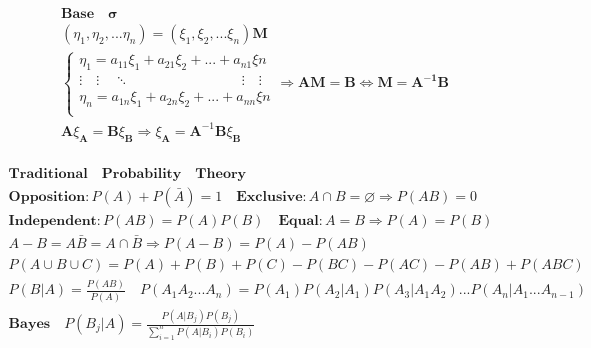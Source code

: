 \documentclass{article}
\begin{document}
\clearpage
\begin{align*} 
    \bm{Base \quad \sigma} \\ 
    (\eta_{1},\eta_{2},...\eta_{n}) = (\xi_{1},\xi_{2},...\xi_{n})\mathbf{M} \\ 
    \left\{
        \begin{array}{rl}
            \eta_{1} = a_{11}\xi_{1} + a_{21}\xi_{2}+...+a_{n1}\xi{n} \\
            \vdots \quad \vdots \quad \ddots  \qquad \qquad \qquad \qquad \vdots \quad \vdots  \\
            \eta_{n} = a_{1n}\xi_{1} + a_{2n}\xi_{2}+...+a_{nn}\xi{n} \\
        \end{array} \Longrightarrow \mathbf{A}\mathbf{M} = \mathbf{B} \Longleftrightarrow \mathbf{M} = \mathbf{A^{-1}}\mathbf{B} 
    \right. \\ 
    \mathbf{A}\xi_{\mathbf{A}} = \mathbf{B}\xi_{\mathbf{B}} \Longrightarrow \xi_{\mathbf{A}} = \mathbf{A}^{-1}\mathbf{B}\xi_{\mathbf{B}} \\ 
\end{align*}

\clearpage 
\begin{align*}
    \bm{Traditional \quad Probability \quad Theory} \\ 
    \bm{Opposition}: P(A)+P(\bar{A}) = 1 \quad \bm{Exclusive}: A\cap B = \varnothing \Rightarrow P(AB)=0\\ 
    \bm{Independent}: P(AB) = P(A)P(B) \quad \bm{Equal}: A = B \Rightarrow P(A) = P(B)\\ 
    A - B = A\bar{B} = A \cap \bar{B} \Rightarrow P(A-B) = P(A) - P(AB) \\ 
    P(A \cup B \cup C) = P(A)+P(B)+P(C)-P(BC)-P(AC)-P(AB)+P(ABC) \\ 
    P(B|A) = \frac{P(AB)}{P(A)} \quad P(A_{1}A_{2}...A_{n}) = P(A_{1})P(A_{2}|A_{1})P(A_{3}|A_{1}A_{2})...P(A_{n}|A_{1}...A_{n-1}) \\
    \bm{Bayes} \quad P(B_{j}|A) = \frac{P(A|B_{j})P(B_{j})}{\sum_{i=1}^n P(A|B_{i})P(B_{i})}\\  
\end{align*}

\clearpage
\end{document}
